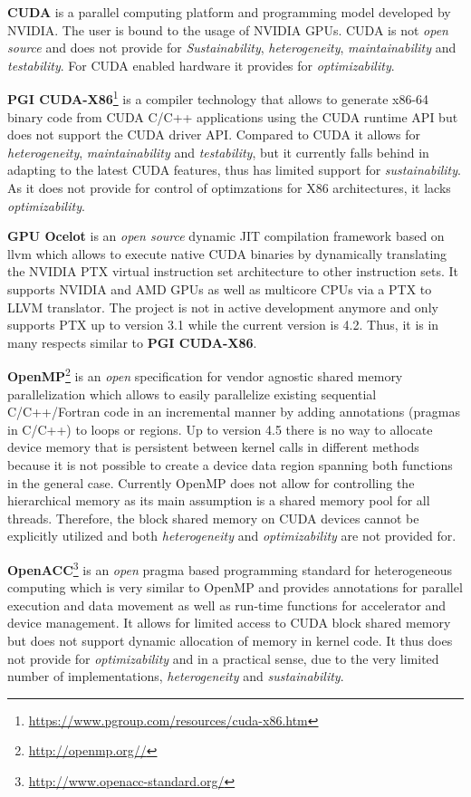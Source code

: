 \documentclass[10pt, twocolumn]{article}
\newcommand{\cuda}{{CUDA}\xspace}
\newcommand{\openmp}{{OpenMP}\xspace}
\newcommand{\nvidia}{{NVIDIA}\xspace}
\newcommand{\amd}{{AMD}\xspace}
\begin{document}
\textbf{\cuda}\cite{CUDAPG}
is a parallel computing platform and programming model developed by \nvidia.
The user is bound to the usage of \nvidia GPUs. \cuda is not \emph{open source} and does not provide for \emph{Sustainability}, \emph{heterogeneity}, \emph{maintainability} and \emph{testability}. For \cuda enabled hardware it provides for \emph{optimizability}.

\textbf{PGI CUDA-X86}\footnote{\url{https://www.pgroup.com/resources/cuda-x86.htm}}
is a compiler technology that allows to generate x86-64 binary code from \cuda C/C++ applications using the \cuda runtime API but does not support the \cuda driver API. Compared to \cuda it allows for \emph{heterogeneity}, \emph{maintainability} and \emph{testability}, but it currently falls behind in adapting to the latest \cuda features, thus has limited support for \emph{sustainability}. As it does not provide for control of optimzations for X86 architectures, it lacks \emph{optimizability}.

\textbf{GPU Ocelot}\cite{kerr2011gpu}
is an \emph{open source} dynamic JIT compilation framework based on llvm which allows to execute native \cuda binaries 
by dynamically translating the \nvidia PTX virtual instruction set architecture to other instruction sets.
It supports \nvidia and \amd GPUs as well as multicore CPUs via a PTX to LLVM translator.
The project is not in active development anymore and only supports PTX up to version 3.1 while the current version is 4.2. Thus, it is in many respects similar to \textbf{PGI CUDA-X86}.

\textbf{\openmp}\footnote{\url{http://openmp.org//}}
is an \emph{open} specification for vendor agnostic shared memory parallelization which allows to easily parallelize existing sequential
C/C++/Fortran code in an incremental manner by adding annotations (pragmas in C/C++) to loops or regions.
Up to version 4.5 there is no way to allocate device memory that is persistent between kernel calls in different methods because
it is not possible to create a device data region spanning both functions in the general case.
Currently \openmp does not allow for controlling the hierarchical memory as its main assumption is a shared memory pool for all threads. Therefore, the block shared memory on \cuda devices cannot be explicitly utilized and both \emph{heterogeneity} and \emph{optimizability} are not provided for.
    
\textbf{OpenACC}\footnote{\url{http://www.openacc-standard.org/}}
is an \emph{open} pragma based programming standard for heterogeneous computing which is very similar to \openmp and provides annotations for parallel execution and data movement as well 
as run-time functions for accelerator and device management.
It allows for limited access to \cuda block shared memory but does not support dynamic allocation of memory in kernel code. It thus does not provide for \emph{optimizability} and in a practical sense, due to the very limited number of implementations, \emph{heterogeneity} and \emph{sustainability}.
    
\end{document}
